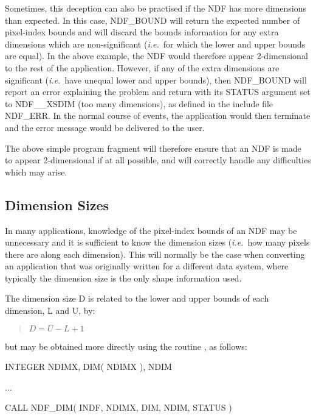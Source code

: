 \documentclass[twoside,11pt,nolof]{starlink}
\providecommand{\st}[1]{{\emph{#1}}}
\begin{document}
Sometimes, this deception can also be practised if the NDF has more
dimensions than expected.
In this case, NDF\_BOUND will return the expected number of pixel-index
bounds and will discard the bounds information for any extra dimensions
which are non-significant (\st{i.e.}\ for which the lower and upper bounds
are equal).
In the above example, the NDF would therefore appear 2-dimensional to the rest
of the application.
However, if any of the extra dimensions are significant (\st{i.e.}\ have
unequal lower and upper bounds), then NDF\_BOUND will report an error
explaining the problem and return with its STATUS argument set to
NDF\_\_XSDIM (too many dimensions), as defined in the include file NDF\_ERR.
In the normal course of events, the application would then terminate and the
error message would be delivered to the user.

The above simple program fragment will therefore ensure that an NDF is made
to appear 2-dimensional if at all possible, and will correctly handle any
difficulties which may arise.

\subsection{Dimension Sizes}

In many applications, knowledge of the pixel-index bounds of an NDF may be
unnecessary and it is sufficient to know the dimension sizes (\st{i.e.}\ how
many pixels there are along each dimension).
This will normally be the case when converting an application that was
originally written for a different data system, where typically the dimension
size is the only shape information used.

The dimension size D is related to the lower and upper bounds of each
dimension, L and U, by:

\small
\begin{quote}
\begin{center}
$D = U - L + 1$
\end{center}
\end{quote}
\normalsize

but may be obtained more directly using the routine , as follows:

\small
\begin{terminalv}
      INTEGER NDIMX, DIM( NDIMX ), NDIM

      ...

      CALL NDF_DIM( INDF, NDIMX, DIM, NDIM, STATUS )
\end{terminalv}
\normalsize
\end{document}
